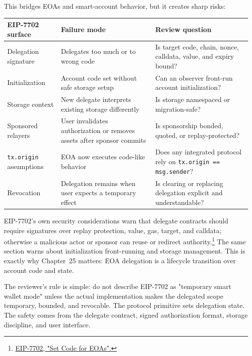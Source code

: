 This bridges EOAs and smart-account behavior, but it creates sharp risks:

\begin{table}[htbp]
\centering
\small
\renewcommand{\arraystretch}{1.14}
\begin{tabularx}{\textwidth}{@{}>{\RaggedRight\arraybackslash}p{}>{\RaggedRight\arraybackslash}p{}X@{}}
\toprule
EIP-7702 surface & Failure mode & Review question \\
\midrule
Delegation signature & Delegates too much or to wrong code & Is target code, chain, nonce, calldata, value, and expiry bound? \\
Initialization & Account code set without safe storage setup & Can an observer front-run account initialization? \\
Storage context & New delegate interprets existing storage differently & Is storage namespaced or migration-safe? \\
Sponsored relayers & User invalidates authorization or removes assets after sponsor commits & Is sponsorship bonded, quoted, or replay-protected? \\
\texttt{tx.origin} assumptions & EOA now executes code-like behavior & Does any integrated protocol rely on \texttt{tx.origin == msg.sender}? \\
Revocation & Delegation remains when user expects a temporary effect & Is clearing or replacing delegation explicit and understandable? \\
\bottomrule
\end{tabularx}
\end{table}

EIP-7702's own security considerations warn that delegate contracts should require signatures over replay protection, value, gas, target, and calldata; otherwise a malicious actor or sponsor can reuse or redirect authority.\footnote{\href{https://eips.ethereum.org/EIPS/eip-7702}{EIP-7702, "Set Code for EOAs".}} The same section warns about initialization front-running and storage management. This is exactly why Chapter~25 matters: EOA delegation is a lifecycle transition over account code and state.

The reviewer's rule is simple: do not describe EIP-7702 as "temporary smart wallet mode" unless the actual implementation makes the delegated scope temporary, bounded, and revocable. The protocol primitive sets delegation state. The safety comes from the delegate contract, signed authorization format, storage discipline, and user interface.

